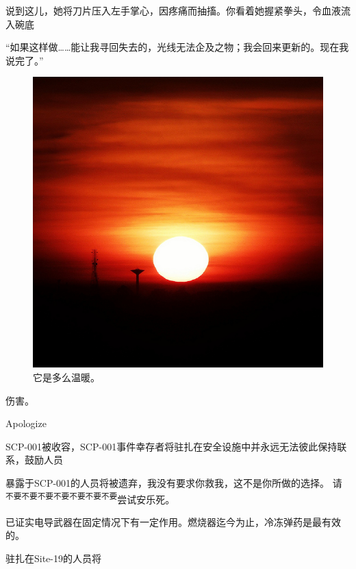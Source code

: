 \begin{scpbox}
说到这儿，她将刀片压入左手掌心，因疼痛而抽搐。你看着她握紧拳头，令血液流入碗底
\end{scpbox}

\begin{scpdialog}
“如果这样做……能让我寻回失去的，光线无法企及之物；我会回来更新的。现在我说完了。”
\end{scpdialog}

\hr


\newpage



\hr


\begin{figure}[H]
	\centering
	\includegraphics[width=0.5\linewidth]{images/SCP-001-when-night-breaks-2.jpg}
	\caption*{它是多么温暖。}
\end{figure}

伤害。

Apologize

SCP-001被收容，SCP-001事件幸存者将驻扎在安全设施中并永远无法彼此保持联系，鼓励人员


暴露于SCP-001的人员将被遗弃，我没有要求你救我，这不是你所做的选择。 请\textsuperscript{
不要不要不要不要不要不要不要}尝试安乐死。

已证实电导武器在固定情况下有一定作用。燃烧器迄今为止，冷冻弹药是最有效的。

驻扎在Site-19的人员将

